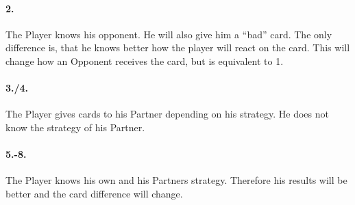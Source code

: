 \paragraph{2.}
The Player knows his opponent. He will also give him a “bad” card. The only difference is, that he knows better how the player will react on the card. This will change how an Opponent receives the card, but is equivalent to 1. 
\paragraph{3./4.}
The Player gives cards to his Partner depending on his strategy. He does not know the strategy of his Partner.
\paragraph{5.-8.}
The Player knows his own and his Partners strategy. Therefore his results will be better and the card difference will change. 

